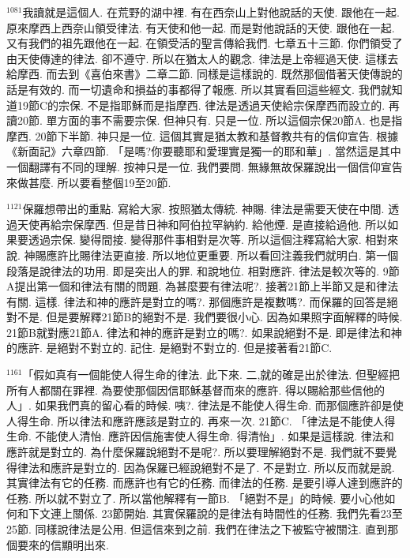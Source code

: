 \documentclass{book}
\begin{document}
$^{1081}$我讀就是這個人.
在荒野的湖中裡.
有在西奈山上對他說話的天使.
跟他在一起.
原來摩西上西奈山領受律法.
有天使和他一起.
而是對他說話的天使.
跟他在一起.
又有我們的祖先跟他在一起.
在領受活的聖言傳給我們.
七章五十三節.
你們領受了由天使傳達的律法.
卻不遵守.
所以在猶太人的觀念.
律法是上帝經過天使.
這樣去給摩西.
而去到《喜伯來書》二章二節.
同樣是這樣說的.
既然那個借著天使傳說的話是有效的.
而一切遺命和損益的事都得了報應.
所以其實看回這些經文.
我們就知道19節C的宗保.
不是指耶穌而是指摩西.
律法是透過天使給宗保摩西而設立的.
再讀20節.
單方面的事不需要宗保.
但神只有.
只是一位.
所以這個宗保20節A.
也是指摩西.
20節下半節.
神只是一位.
這個其實是猶太教和基督教共有的信仰宣告.
根據《新面記》六章四節.
「是嗎?你要聽耶和愛理實是獨一的耶和華」.
當然這是其中一個翻譯有不同的理解.
按神只是一位.
我們要問.
無緣無故保羅說出一個信仰宣告來做甚麼.
所以要看整個19至20節.

$^{1121}$保羅想帶出的重點.
寫給大家.
按照猶太傳統.
神賜.
律法是需要天使在中間.
透過天使再給宗保摩西.
但是昔日神和阿伯拉罕納約.
給他煙.
是直接給過他.
所以如果要透過宗保.
變得間接.
變得那件事相對是次等.
所以這個注釋寫給大家.
相對來說.
神賜應許比賜律法更直接.
所以地位更重要.
所以看回注義我們就明白.
第一個段落是說律法的功用.
即是突出人的罪.
和說地位.
相對應許.
律法是較次等的.
9節A提出第一個和律法有關的問題.
為甚麼要有律法呢?.
接著21節上半節又是和律法有關.
這樣.
律法和神的應許是對立的嗎?.
那個應許是複數嗎?.
而保羅的回答是絕對不是.
但是要解釋21節B的絕對不是.
我們要很小心.
因為如果照字面解釋的時候.
21節B就對應21節A.
律法和神的應許是對立的嗎?.
如果說絕對不是.
即是律法和神的應許.
是絕對不對立的.
記住.
是絕對不對立的.
但是接著看21節C.

$^{1161}$「假如真有一個能使人得生命的律法.
此下來.
二,就的確是出於律法.
但聖經把所有人都關在罪裡.
為要使那個因信耶穌基督而來的應許.
得以賜給那些信他的人」.
如果我們真的留心看的時候.
咦?.
律法是不能使人得生命.
而那個應許卻是使人得生命.
所以律法和應許應該是對立的.
再來一次.
21節C.
「律法是不能使人得生命.
不能使人清怡.
應許因信施害使人得生命.
得清怡」.
如果是這樣說.
律法和應許就是對立的.
為什麼保羅說絕對不是呢?.
所以要理解絕對不是.
我們就不要覺得律法和應許是對立的.
因為保羅已經說絕對不是了.
不是對立.
所以反而就是說.
其實律法有它的任務.
而應許也有它的任務.
而律法的任務.
是要引導人達到應許的任務.
所以就不對立了.
所以當他解釋有一節B.
「絕對不是」的時候.
要小心他如何和下文連上關係.
23節開始.
其實保羅說的是律法有時間性的任務.
我們先看23至25節.
同樣說律法是公用.
但這信來到之前.
我們在律法之下被監守被關注.
直到那個要來的信顯明出來.
\end{document}
